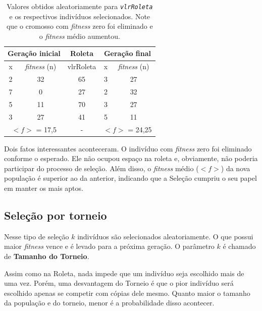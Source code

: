 \begin{table}[htp]
	\caption{\label{tabRoletaManual}Valores obtidos aleatoriamente para \textit{\texttt{vlrRoleta}} e os respectivos indivíduos selecionados. Note que o cromosso com \textit{fitness} zero foi eliminado e o \textit{fitness} médio aumentou.}
	\begin{center}
		\begin{tabular}{c|c|c|c|c}
			\hline
			\multicolumn{2}{c|}{\textbf{Geração inicial}} & \textbf{Roleta}& \multicolumn{2}{c}{\textbf{Geração final}}  \\
			\hline
			x 					& \textit{fitness} (n)	& vlrRoleta						& x						& \textit{fitness} (n)	\\
			\hline
			2 					& 32										& 65 									& 3						&	27   \\
			7 					& 0 										& 27 									& 2						&	32\\
			5 					& 11										& 70 									& 3						&	27\\	
			3 					& 27										& 41 									& 5						&	11\\
			\hline
			\multicolumn{2}{c|}{$<f>$ = 17,5} & - & \multicolumn{2}{c}{$<f>$ = 24,25}  \\
			\hline
		\end{tabular}
	\end{center}
\end{table}
	
	Dois fatos interessantes aconteceram. O indivíduo com \textit{fitness} zero foi eliminado conforme o esperado. Ele não ocupou espaço na roleta e, obviamente, não poderia participar do processo de seleção. Além disso, o \textit{fitness} médio ($<f>$) da nova população é superior ao da anterior, indicando que a Seleção cumpriu o seu papel em manter os mais aptos.
	
	\subsection{Seleção por torneio}\label{sec:torneio}
	
	Nesse tipo de seleção $k$ indivíduos são selecionados aleatoriamente. O que possui maior \emph{fitness} vence e é levado para a próxima geração. O parâmetro $k$ é chamado de \textbf{Tamanho do Torneio}.
	
	Assim como na Roleta, nada impede que um indivíduo seja escolhido mais de uma vez. Porém, uma desvantagem do Torneio é que o pior indivíduo será escolhido apenas se competir com cópias dele mesmo. Quanto maior o tamanho da população e do torneio, menor é a probabilidade disso acontecer.
	
